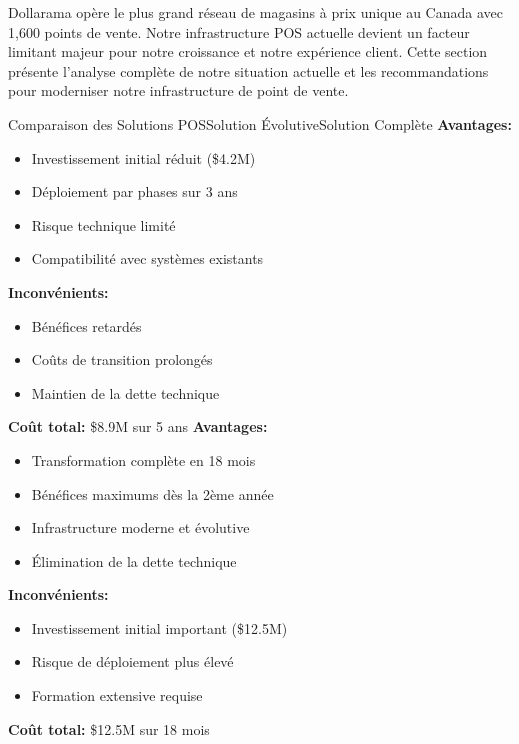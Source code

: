 \documentclass{TemplatesParametriques/dollarama}
\begin{document}
\begin{dollaramaintroduction}{
    Dollarama opère le plus grand réseau de magasins à prix unique au Canada avec 1,600 points de vente. Notre infrastructure POS actuelle devient un facteur limitant majeur pour notre croissance et notre expérience client.
}
    Cette section présente l'analyse complète de notre situation actuelle et les recommandations pour moderniser notre infrastructure de point de vente.
    
\end{dollaramaintroduction}


\begin{dollaramacomparison}{Comparaison des Solutions POS}{Solution Évolutive}{Solution Complète}
    \textbf{Avantages:}
    \begin{itemize}
        \item Investissement initial réduit (\$4.2M)
        \item Déploiement par phases sur 3 ans
        \item Risque technique limité
        \item Compatibilité avec systèmes existants
    \end{itemize}
    
    \textbf{Inconvénients:}
    \begin{itemize}
        \item Bénéfices retardés
        \item Coûts de transition prolongés
        \item Maintien de la dette technique
    \end{itemize}
    
    \textbf{Coût total:} \$8.9M sur 5 ans
\vscompare
    \textbf{Avantages:}
    \begin{itemize}
        \item Transformation complète en 18 mois
        \item Bénéfices maximums dès la 2ème année
        \item Infrastructure moderne et évolutive
        \item Élimination de la dette technique
    \end{itemize}
    
    \textbf{Inconvénients:}
    \begin{itemize}
        \item Investissement initial important (\$12.5M)
        \item Risque de déploiement plus élevé
        \item Formation extensive requise
    \end{itemize}
    
    \textbf{Coût total:} \$12.5M sur 18 mois
\end{dollaramacomparison}
\end{document}
